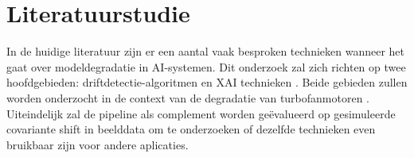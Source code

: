 




\section{Literatuurstudie}%
\label{sec:literatuurstudie}

In de huidige literatuur zijn er een aantal vaak besproken technieken wanneer het gaat over modeldegradatie in AI-systemen. Dit onderzoek zal zich richten op twee hoofdgebieden: driftdetectie-algoritmen \autocite{Bayram2022} en XAI technieken \autocite{Ribeiro2016}. Beide gebieden zullen worden onderzocht in de context van de degradatie van turbofanmotoren \autocite{Saxena2008}. Uiteindelijk zal de pipeline als complement worden geëvalueerd op gesimuleerde covariante shift in beelddata \autocite{Hendrycks2019} om te onderzoeken of dezelfde technieken even bruikbaar zijn voor andere aplicaties.

